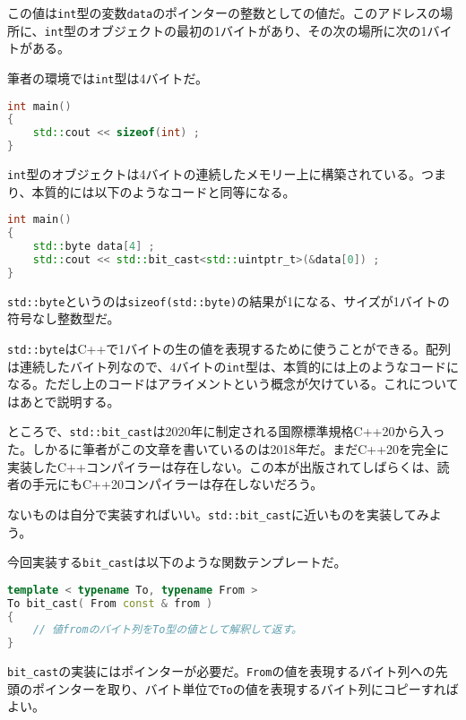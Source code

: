 この値は\texttt{int}型の変数\texttt{data}のポインターの整数としての値だ。このアドレスの場所に、\texttt{int}型のオブジェクトの最初の1バイトがあり、その次の場所に次の1バイトがある。

筆者の環境では\texttt{int}型は4バイトだ。

\begin{lstlisting}[language={C++}]
int main()
{
    std::cout << sizeof(int) ;
}
\end{lstlisting}

\texttt{int}型のオブジェクトは4バイトの連続したメモリー上に構築されている。つまり、本質的には以下のようなコードと同等になる。

\begin{lstlisting}[language={C++}]
int main()
{
    std::byte data[4] ;
    std::cout << std::bit_cast<std::uintptr_t>(&data[0]) ;
}
\end{lstlisting}

\texttt{std::byte}というのは\texttt{sizeof(std::byte)}の結果が1になる、サイズが1バイトの符号なし整数型だ。

\texttt{std::byte}はC++で1バイトの生の値を表現するために使うことができる。配列は連続したバイト列なので、4バイトの\texttt{int}型は、本質的には上のようなコードになる。ただし上のコードはアライメントという概念が欠けている。これについてはあとで説明する。

ところで、\texttt{std::bit\_cast}は2020年に制定される国際標準規格C++20から入った。しかるに筆者がこの文章を書いているのは2018年だ。まだC++20を完全に実装したC++コンパイラーは存在しない。この本が出版されてしばらくは、読者の手元にもC++20コンパイラーは存在しないだろう。

\clearpage
{}

ないものは自分で実装すればいい。\texttt{std::bit\_cast}に近いものを実装してみよう。

今回実装する\texttt{bit\_cast}は以下のような関数テンプレートだ。

\begin{lstlisting}[language={C++}]
template < typename To, typename From >
To bit_cast( From const & from )
{
    // 値fromのバイト列をTo型の値として解釈して返す。
}
\end{lstlisting}

\texttt{bit\_cast}の実装にはポインターが必要だ。\texttt{From}の値を表現するバイト列への先頭のポインターを取り、バイト単位で\texttt{To}の値を表現するバイト列にコピーすればよい。

